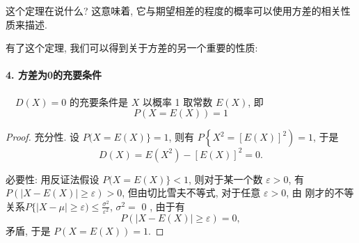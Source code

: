 这个定理在说什么? 这意味着, 它与期望相差的程度的概率可以使用方差的相关性质来描述. 

有了这个定理, 我们可以得到关于方差的另一个重要的性质: 

\paragraph{4. 方差为0的充要条件} $\quad D(X)=0$ 的充要条件是 $X$ 以概率 1 取常数 $E(X)$, 即
$$
P(X=E(X))=1
$$

\begin{proof}
    充分性. 设 $P(X=E(X)\}=1$, 则有 $P\left\{X^2=[E(X)]^2\right)=1$, 于是
    $$
    D(X)=E\left(X^2\right)-[E(X)]^2=0 .
    $$
    
    必要性: 用反证法假设 $P(X=E(X)\}<1$, 则对于某一个数 $\varepsilon>0$, 有 $P(|X-E(X)| \geqslant \varepsilon)>0$, 但由切比雪夫不等式, 对于任意 $\varepsilon>0$, 由 刚才的不等关系$P\{|X-\mu| \geqslant \varepsilon) \leq \frac{\sigma^2}{\varepsilon^2}$, $\sigma^2=$ 0 , 由于有
    $$
    P(|X-E(X)| \geqslant \varepsilon)=0,
    $$
    矛盾, 于是 $P(X=E(X))=1$.
\end{proof}